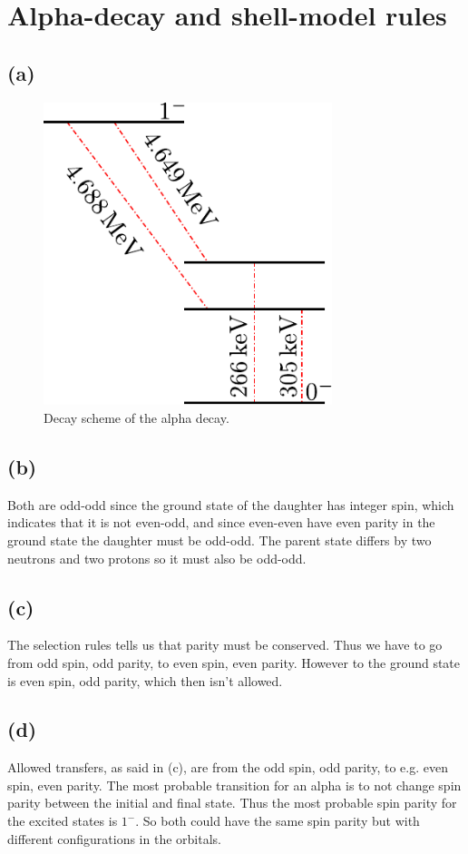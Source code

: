 \section{Alpha-decay and shell-model rules}
\subsection*{(a)}
\begin{figure}[H]
	\centering
	\includegraphics[width=0.75\textwidth]{figures/6b.pdf}
	\caption{Decay scheme of the alpha decay.}
\end{figure}

\subsection*{(b)}
Both are odd-odd since the ground state of the daughter has integer spin, which indicates that it is not even-odd, and since even-even have even parity in the ground state the daughter must be odd-odd. The parent state differs by two neutrons and two protons so it must also be odd-odd.

\subsection*{(c)}
The selection rules tells us that parity must be conserved. Thus we have to go from odd spin, odd parity, to even spin, even parity. However to the ground state is even spin, odd parity, which then isn't allowed.

\subsection*{(d)}
Allowed transfers, as said in (c), are from the odd spin, odd parity, to e.g. even spin, even parity. The most probable transition for an alpha is to not change spin parity between the initial and final state. Thus the most probable spin parity for the excited states is $1^-$. So both could have the same spin parity but with different configurations in the orbitals.
